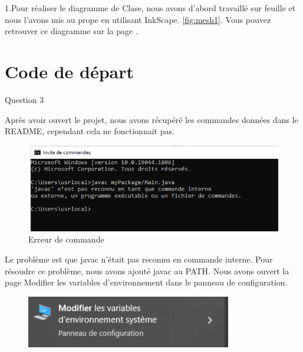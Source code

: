 \documentclass{article}
\begin{document}


1.Pour réaliser le diagramme de Clase, nous avons d'abord travaillé sur feuille et nous l'avons mis au prope en utilisant InkScape.  \ref{fig:mesh1}. Vous pouvez retrouver ce diagramme sur la page \pageref{fig:mesh1}.
\newline
\newpage
\section{Code de départ}


Question 3
\newline


Après avoir ouvert le projet, nous avons récupéré les commandes données dans le README, cependant cela ne fonctionnait pas.
\newline

\begin{figure}[h]

\includegraphics[width=1\textwidth]{erreurjavac.png}
\caption{Erreur de commande}
\end{figure}

 Le problème est que javac n'était pas reconnu en commande interne. Pour résoudre ce problème, nous avons ajouté javac au PATH.
 Nous avons ouvert la page Modifier les variables d'environnement dans le panneau de configuration.

\begin{figure}[h]
\includegraphics[width=0.8\textwidth]{Annotation 2023-01-10 143053.png}
\end{figure}
\end{document}
